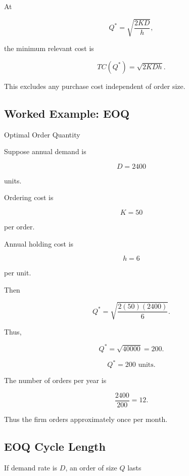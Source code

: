 At

\[
Q^*
=
\sqrt{\frac{2KD}{h}},
\]

the minimum relevant cost is

\[
\boxed{
TC(Q^*)
=
\sqrt{2KDh}.
}
\]

This excludes any purchase cost independent of order size.

\subsection{Worked Example: EOQ}
\label{subsec:worked-eoq}

\begin{workedexamplebox}{Optimal Order Quantity}

Suppose annual demand is

\[
D=2400
\]

units.

Ordering cost is

\[
K=50
\]

per order.

Annual holding cost is

\[
h=6
\]

per unit.

Then

\[
Q^*
=
\sqrt{
\frac{
2(50)(2400)
}{
6
}
}.
\]

Thus,

\[
Q^*
=
\sqrt{40000}
=
200.
\]

\begin{answerbox}
\[
\boxed{
Q^*=200\text{ units}.
}
\]
\end{answerbox}

The number of orders per year is

\[
\frac{2400}{200}
=
12.
\]

Thus the firm orders approximately once per month.

\end{workedexamplebox}

\subsection{EOQ Cycle Length}
\label{subsec:eoq-cycle-length}

If demand rate is \(D\), an order of size \(Q\) lasts

